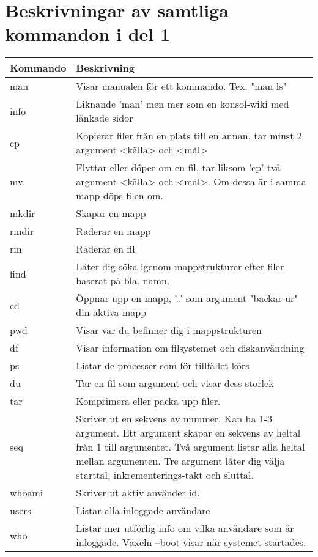 \documentclass[11pt]{article}
\begin{document}
\section{Beskrivningar av samtliga kommandon i del 1}
\begin{center}
    \begin{longtable}{ | l | p{10cm} |}
    \hline
    Kommando & Beskrivning \\ \hline
    man & Visar manualen för ett kommando. Tex. "man ls" \\ \hline
    info & Liknande 'man' men mer som en konsol-wiki med länkade sidor \\ \hline	
	cp & Kopierar filer från en plats till en annan, tar minst 2 argument <källa> och <mål> \\ \hline	
	mv & Flyttar eller döper om en fil, tar liksom 'cp' två argument <källa> och <mål>. Om dessa är i samma mapp döps filen om.  \\ \hline	
	mkdir & Skapar en mapp \\ \hline	
	rmdir & Raderar en mapp \\ \hline	
	rm & Raderar en fil \\ \hline	
	find & Låter dig söka igenom mappstrukturer efter filer baserat på bla. namn.\\ \hline	
	cd & Öppnar upp en mapp, '..' som argument "backar ur" din aktiva mapp \\ \hline	
	pwd &  Visar var du befinner dig i mappstrukturen\\ \hline	
	df & Visar information om filsystemet och diskanvändning \\ \hline	
	ps & Listar de processer som för tillfället körs \\ \hline	
	du & Tar en fil som argument och visar dess storlek \\ \hline	
	tar & Komprimera eller packa upp filer.\\ \hline	
	seq & Skriver ut en sekvens av nummer. Kan ha 1-3 argument. Ett argument skapar en sekvens av heltal från 1 till argumentet. Två argument listar alla heltal mellan argumenten. Tre argument låter dig välja starttal, inkrementerings-takt och sluttal.\\ \hline	
	whoami & Skriver ut aktiv använder id. \\ \hline	
	users & Listar alla inloggade användare\\ \hline	
	who & Listar mer utförlig info om vilka användare som är inloggade. Växeln --boot visar när systemet startades.\\ \hline	

\end{longtable}
\end{center}
\end{document}
